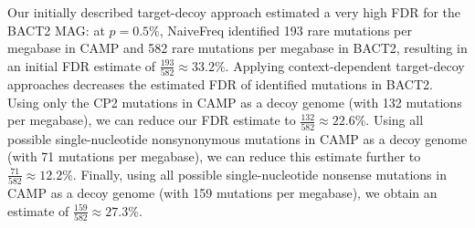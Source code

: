 Our initially described target-decoy approach estimated a very high FDR for the BACT2 MAG:
at $p = 0.5\%$, NaiveFreq identified 193 rare mutations per megabase in CAMP and 582 rare mutations per megabase in BACT2, resulting in an initial FDR estimate of $\frac{193}{582} \approx 33.2\%$.
%
Applying context-dependent target-decoy approaches decreases the estimated FDR of identified mutations in BACT2.
%
Using only the CP2 mutations in CAMP as a decoy genome (with 132 mutations per megabase), we can reduce our FDR estimate to $\frac{132}{582} \approx 22.6\%$.
%
Using all possible single-nucleotide nonsynonymous mutations in CAMP as a decoy genome (with 71 mutations per megabase), we can reduce this estimate further to $\frac{71}{582} \approx 12.2\%$.
%
Finally, using all possible single-nucleotide nonsense mutations in CAMP as a decoy genome (with 159 mutations per megabase), we obtain an estimate of $\frac{159}{582} \approx 27.3\%$.
\endinput